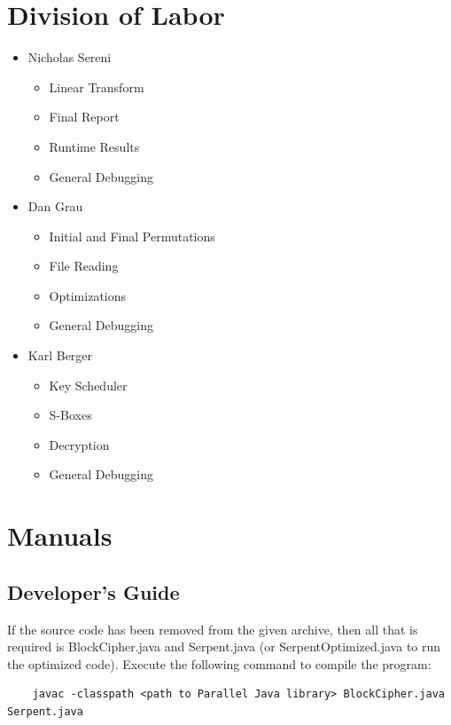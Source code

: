 \documentclass[12pt]{article} %
\begin{document}
\section{Division of Labor}
\begin{itemize}
 \item Nicholas Sereni
 \begin{itemize}
  \item{Linear Transform}
  \item{Final Report}
  \item{Runtime Results}
  \item{General Debugging}
 \end{itemize}
 \item{Dan Grau}
 \begin{itemize}
  \item{Initial and Final Permutations}
  \item{File Reading}
  \item{Optimizations}
  \item{General Debugging}
 \end{itemize}
 \item{Karl Berger}
 \begin{itemize}
  \item{Key Scheduler}
  \item{S-Boxes}
  \item{Decryption}
  \item{General Debugging}
 \end{itemize}
\end{itemize}

\section{Manuals}
\subsection{Developer's Guide}
  If the source code has been removed from the given archive, then all that is required is BlockCipher.java and Serpent.java (or SerpentOptimized.java to run the optimized code).  Execute the following command to compile the program:
  \begin{verbatim}
  	javac -classpath <path to Parallel Java library> BlockCipher.java Serpent.java
  \end{verbatim}
  
\end{document}
